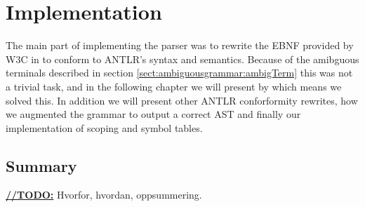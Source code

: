 \chapter{Implementation}


The main part of implementing the parser was to rewrite the EBNF provided by W3C in \cite{w3c01} to conform to ANTLR's syntax and semantics. Because of the amibguous terminals described in section \ref{sect:ambiguousgrammar:ambigTerm} this was not a trivial task, and in the following chapter we will present by which means we solved this. In addition we will present other ANTLR conforformity rewrites, how we augmented the grammar to output a correct AST and finally our implementation of scoping and symbol tables.









\section{Summary}
\underline{\textbf{\LARGE //TODO:}}
Hvorfor, hvordan, oppsummering.